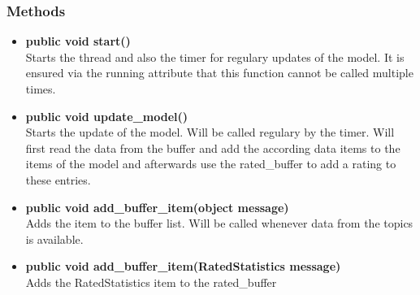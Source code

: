 \subsubsection{Methods}
\begin{itemize}
  \item \textbf{public void start()}\\
  Starts the thread and also the timer for regulary updates of the model. It is ensured via the running attribute that this function cannot be called multiple times.
  \item \textbf{public void update\_model()}\\ 
  Starts the update of the model. Will be called regulary by the timer. Will first read the data from the buffer and add the according data items to the items of the model and afterwards use the rated\_buffer to add a rating to these entries.
  \item \textbf{public void add\_buffer\_item(object message)}\\ 
  Adds the item to the buffer list. Will be called whenever data from the topics
  is available.
  \item \textbf{public void add\_buffer\_item(RatedStatistics message)}\\
  Adds the RatedStatistics item to the rated\_buffer
\end{itemize}

